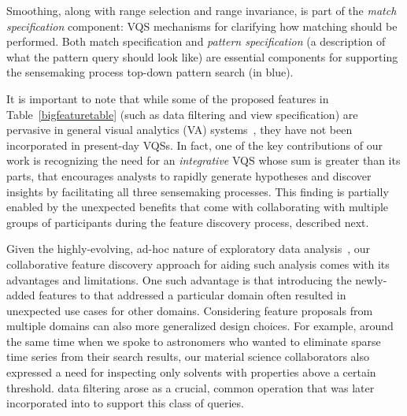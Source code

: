  Smoothing, along with range selection and range invariance, is part of the \emph{match specification} component: VQS mechanisms for clarifying how matching should be performed. Both match specification and \emph{pattern specification} (a description of what the pattern query should look like) are essential components for supporting the sensemaking process top-down pattern search (in blue).%
 \par It is important to note that while some of the proposed features in Table~\ref{bigfeaturetable} (such as data filtering and view specification) are pervasive in general visual analytics (VA) systems~\cite{Heer2012,Amar2005}, they have not been incorporated in present-day VQSs. In fact, one of the key contributions of our work is recognizing the need for an \emph{integrative} VQS whose sum is greater than its parts, that encourages analysts to rapidly generate hypotheses and discover insights by facilitating all three sensemaking processes. This finding is partially enabled by the unexpected benefits that come with collaborating with multiple groups of participants during the feature discovery process, described next.
 \par Given the highly-evolving, ad-hoc nature of exploratory data analysis~\cite{Keim2006,Tukey1970}, our collaborative feature discovery approach for aiding such analysis comes with its advantages and limitations. One such advantage is that introducing the newly-added features to \zvpp that addressed a particular domain often resulted in unexpected use cases for other domains. Considering feature proposals from multiple domains can also  more generalized design choices. For example, around the same time when we spoke to astronomers who wanted to eliminate sparse time series from their search results, our material science collaborators also expressed a need for inspecting only solvents with properties above a certain threshold.  data filtering arose as a crucial, common operation that was later incorporated into \zvpp to support this class of queries. %
